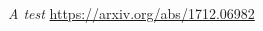 \documentclass[pdftex,12pt,letter]{article}
\begin{document}
\clearpage

\begin{thebibliography}{1}

{\textit{A test} \url{https://arxiv.org/abs/1712.06982}}

\end{thebibliography}
\end{document}
